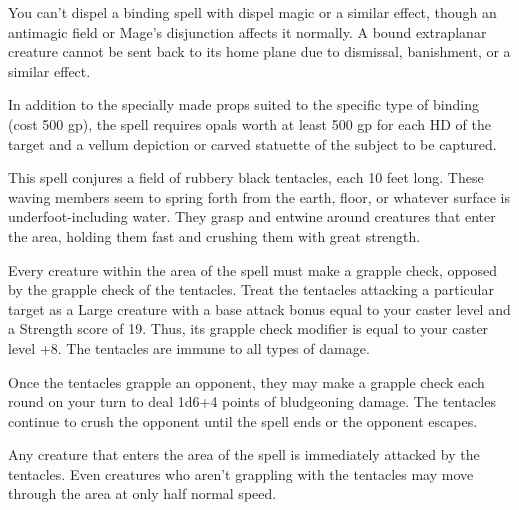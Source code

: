 \begin{multicols}{2}
\begin{small}
\smallskip\noindent You can't dispel a binding spell with dispel magic or a similar effect, though an antimagic field or Mage's disjunction affects it normally. A bound extraplanar creature cannot be sent back to its home plane due to dismissal, banishment, or a similar effect.

 In addition to the specially made props suited to the specific type of binding (cost 500 gp), the spell requires opals worth at least 500 gp for each HD of the target and a vellum depiction or carved statuette of the subject to be captured.

\noindent This spell conjures a field of rubbery black tentacles, each 10 feet long. These waving members seem to spring forth from the earth, floor, or whatever surface is underfoot-including water. They grasp and entwine around creatures that enter the area, holding them fast and crushing them with great strength.

\smallskip\noindent Every creature within the area of the spell must make a grapple check, opposed by the grapple check of the tentacles. Treat the tentacles attacking a particular target as a Large creature with a base attack bonus equal to your caster level and a Strength score of 19. Thus, its grapple check modifier is equal to your caster level +8. The tentacles are immune to all types of damage.

\smallskip\noindent Once the tentacles grapple an opponent, they may make a grapple check each round on your turn to deal 1d6+4 points of bludgeoning damage. The tentacles continue to crush the opponent until the spell ends or the opponent escapes.

\smallskip\noindent Any creature that enters the area of the spell is immediately attacked by the tentacles. Even creatures who aren't grappling with the tentacles may move through the area at only half normal speed.


\end{small}
\end{multicols}
